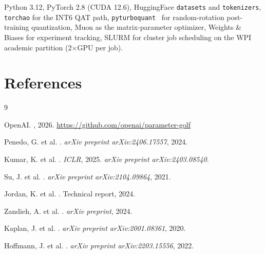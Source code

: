 \documentclass[11pt, letterpaper]{article}
\begin{document}
Python 3.12, PyTorch 2.8 (CUDA 12.6), HuggingFace
\texttt{datasets} and \texttt{tokenizers}, \texttt{torchao}
for the INT6 QAT path, \texttt{pyturboquant}~\cite{turboquant2024}
for random-rotation post-training quantization, Muon as the
matrix-parameter optimizer, Weights \& Biases for experiment
tracking, SLURM for cluster job scheduling on the WPI academic
partition (2$\times$GPU per job).

\section*{References}
\begingroup
\renewcommand{\section}[2]{}
\begin{thebibliography}{9}

OpenAI.
, 2026.
\newblock \url{https://github.com/openai/parameter-golf}

Penedo, G. et al.
.
\newblock \textit{arXiv preprint arXiv:2406.17557}, 2024.

Kumar, K. et al.
.
\newblock \textit{ICLR}, 2025.
\newblock \textit{arXiv preprint arXiv:2403.08540}.

Su, J. et al.
.
\newblock \textit{arXiv preprint arXiv:2104.09864}, 2021.

Jordan, K. et al.
.
\newblock Technical report, 2024.

Zandieh, A. et al.
.
\newblock \textit{arXiv preprint}, 2024.

Kaplan, J. et al.
.
\newblock \textit{arXiv preprint arXiv:2001.08361}, 2020.

Hoffmann, J. et al.
.
\newblock \textit{arXiv preprint arXiv:2203.15556}, 2022.

\end{thebibliography}
\endgroup
\end{document}
